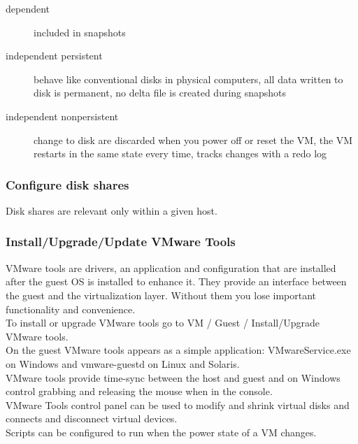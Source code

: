 \begin{description}

\item[dependent]
included in snapshots

\item[independent persistent]
behave like conventional disks in physical computers, all data written to
disk is permanent, no delta file is created during snapshots

\item[independent nonpersistent]
change to disk are discarded when you power off or reset the VM, the VM
restarts in the same state every time, tracks changes with a redo log

\end{description}

\subsubsection{Configure disk shares}

Disk shares are relevant only within a given host.

\subsubsection{Install/Upgrade/Update VMware Tools}

VMware tools are drivers, an application and configuration that are installed
after the guest OS is installed to enhance it. They provide an interface
between the guest and the virtualization layer. Without them you lose
important functionality and convenience.\\

To install or upgrade VMware tools go to VM / Guest / Install/Upgrade VMware
tools.\\

On the guest VMware tools appears as a simple application: VMwareService.exe
on Windows and vmware-guestd on Linux and Solaris.\\

VMware tools provide time-sync between the host and guest and on Windows
control grabbing and releasing the mouse when in the console.\\

VMware Tools control panel can be used to modify and shrink virtual disks and
connects and disconnect virtual devices.\\

Scripts can be configured to run when the power state of a VM changes.\\

